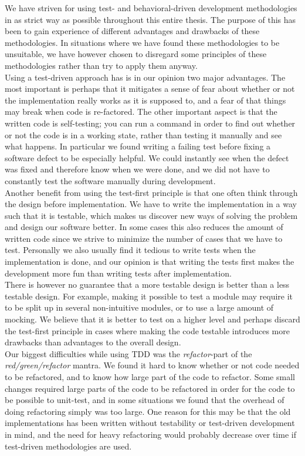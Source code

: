 
We have striven for using test- and behavioral-driven development
methodologies in as strict way as possible throughout this entire
thesis. The purpose of this has been to gain experience of different
advantages and drawbacks of these methodologies. In situations where we
have found these methodologies to be unsuitable, we have however chosen
to disregard some principles of these methodologies rather than try to
apply them anyway.\\

Using a test-driven approach has is in our opinion two major advantages.
The most important is perhaps that it mitigates a sense of fear about
whether or not the implementation really works as it is supposed to, and
a fear of that things may break when code is re-factored. The other
important aspect is that the written code is self-testing; you can run a
command in order to find out whether or not the code is in a working
state, rather than testing it manually and see what happens. In
particular we found writing a failing test before fixing a software
defect to be especially helpful. We could instantly see when the defect
was fixed and therefore know when we were done, and we did not have to
constantly test the software manually during development.\\

Another benefit from using the test-first principle is that one often
think through the design before implementation. We have to write the
implementation in a way such that it is testable, which makes us
discover new ways of solving the problem and design our software better.
In some cases this also reduces the amount of written code since we
strive to minimize the number of cases that we have to test. Personally
we also usually find it tedious to write tests when the implementation
is done, and our opinion is that writing the tests first makes the
development more fun than writing tests after implementation.\\

There is however no guarantee that a more testable design is better than
a less testable design. For example, making it possible to test a module
may require it to be split up in several non-intuitive modules, or to
use a large amount of mocking. We believe that it is better to test on a
higher level and perhaps discard the test-first principle in cases where
making the code testable introduces more drawbacks than advantages to
the overall design.\\

Our biggest difficulties while using TDD was the \emph{refactor}-part of
the \emph{red/green/refactor} mantra. We found it hard to know whether
or not code needed to be refactored, and to know how large part of the
code to refactor. Some small changes required large parts of the code to
be refactored in order for the code to be possible to unit-test, and in
some situations we found that the overhead of doing refactoring simply
was too large. One reason for this may be that the old implementations
has been written without testability or test-driven development in mind,
and the need for heavy refactoring would probably decrease over time if
test-driven methodologies are used.\\

